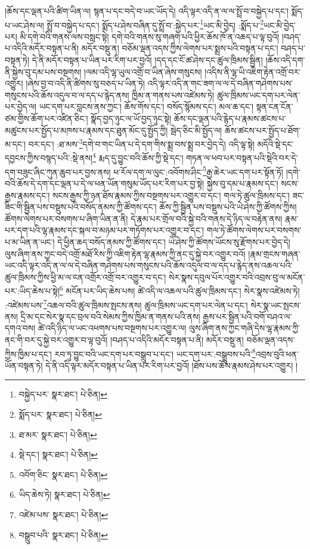 །ཆོས་དང་ལྡན་པའི་ཚིག་ཡིན་ལ། སྙན་པ་དང་བདེ་བ་ཡང་ཡོད་དེ། འདི་ལྟར་འདི་ན་ལ་ལ་སྤྲོ་བ་བསྐྱེད་པ་དང་། སྨོད་པ་ཡང་ཤེས་ལ། སྤྲོ་བ་བསྐྱེད་པ་དང་། སྨོད་པ་ཤེས་བཞིན་དུ་སྤྲོ་བ་:སྐྱེད་པར་\footnote{བསྐྱེད་པར་  སྣར་ཐང་།  པེ་ཅིན། }ཡང་མི་བྱེད། :སྨོད་པ་\footnote{སྨོད་པར་  སྣར་ཐང་།  པེ་ཅིན། }ཡང་མི་བྱེད་པར། མི་དགེ་བའི་གནས་ལས་བསླང་སྟེ། དགེ་བའི་གནས་སུ་གཞག་པའི་ཕྱིར་ཆོས་ཁོ་ན་འཆད་པ་ལྟ་བུའོ། །བཤད་པ་འདིའི་མདོར་བསྟན་པ་ནི། མདོར་བསྡུ་ན། བཅོམ་ལྡན་འདས་ཀྱིས་ལེགས་པར་སྨྲས་པའི་བསྟན་པ་དང་། བཤད་པ་བསྟན་ཏེ། དེ་ནི་མདོར་བསྟན་པ་ཡིན་པར་རིག་པར་བྱའོ། །དད་དང་ངོ་ཚ་ཤེས་དང་ཚུལ་ཁྲིམས་སྦྱིན། །ཆོས་འདི་དག་ནི་སྐྱེས་བུ་དམ་པས་བསྔགས། །ལམ་འདི་ལྷ་ཡུལ་འགྲོ་བ་ཡིན་ཞེས་གསུངས། །འདིས་ནི་ལྷ་ཡི་འཇིག་རྟེན་འགྲོ་བར་འགྱུར། །ཞེས་བྱ་བ་འདི་ནི་ཚིགས་སུ་བཅད་པ་ཡིན་ཏེ། འདི་ལྟར་འདི་ན་གང་ཟག་ལ་ལ་དེ་བཞིན་གཤེགས་པས་གསུངས་པའི་ཆོས་འདུལ་བ་ལ་དད་པ་རྙེད་ནས། ཁྱིམ་ན་གནས་པས་འཛེམས་ཏེ། ཚུལ་ཁྲིམས་ཡང་དག་པར་ལེན་པར་བྱེད་ལ། ཡང་དག་པར་བླངས་ནས་ཀྱང་། ཆོས་གོས་དང་། བསོད་སྙོམས་དང་། མལ་ཆ་དང་། སྟན་ངན་ངོན་ཙམ་གྱིས་ཆོག་པར་འཛིན་ཅིང་། སྣོད་བྱད་ཉུང་ལ་ཡོ་བྱད་ཉུང་སྟེ། ཆོས་དང་ལྡན་པའི་རྙེད་པ་རྣམས་ཚངས་པ་མཚུངས་པར་སྤྱོད་པ་མཁས་པ་རྣམས་དང་ཐུན་མོང་དུ་སྤྱོད་ཀྱི། སྦེད་ཅིང་མི་སྤྱོད་ལ། ཆོས་ཚངས་པར་སྤྱོད་པ་ཐོག་མ་དང་། བར་དང་། :ཐ་མས་\footnote{ཐ་མར་  སྣར་ཐང་།  པེ་ཅིན། }དགེ་བ་གང་ཡིན་པ་དེ་དག་གིས་སྨྲ་བས་སྨྲ་བར་བྱེད་དེ། འདི་ལྟ་སྟེ། མདོའི་སྡེ་དང་དབྱངས་ཀྱིས་བསྙད་པའི་:སྡེ་ནས།\footnote{སྡེ་དང་།  སྣར་ཐང་།  པེ་ཅིན། } རྨད་དུ་བྱུང་བའི་ཆོས་ཀྱི་སྡེ་དང་། གཏན་ལ་ཕབ་པར་བསྟན་པའི་སྡེའི་བར་དེ་དག་བཟུང་ཞིང་ཀུན་ཆུབ་པར་བྱས་ནས། ཕ་རོལ་དག་ལ་ལུང་:འབོགས་ཤིང་\footnote{འབོག་ཅིང་  སྣར་ཐང་།  པེ་ཅིན། }རྒྱ་ཆེར་ཡང་དག་པར་སྟོན་ཏོ། །དགེ་བའི་ཆོས་དེ་དག་དང་ལྡན་པ་དེ་ལ་ཕན་ཡོན་གསུམ་ཡོད་པར་རིག་པར་བྱ་སྟེ། སྐྱེས་བུ་དམ་པ་རྣམས་དང་། སངས་རྒྱས་རྣམས་དང་། སངས་རྒྱས་ཀྱི་ཉན་ཐོས་རྣམས་ཀྱིས་བསྔགས་པར་འགྱུར་བ་དང་། གལ་ཏེ་ཚུལ་ཁྲིམས་དང་། ཟང་ཟིང་གི་སྦྱིན་པས་བསྡུས་པའི་བསོད་ནམས་ཀྱི་ཚོགས་དང་། ཆོས་ཀྱི་སྦྱིན་པས་བསྡུས་པའི་ཡེ་ཤེས་ཀྱི་ཚོགས་ཀྱིས། ཚོགས་ལེགས་པར་བསགས་པ་ཞིག་ཡིན་ན་ནི། དེ་རྣམ་པར་གྲོལ་བའི་སྐྱེ་བའི་གནས་དེ་ཉིད་ལ་བརྟེན་ནས། རྣམ་པར་དག་པའི་ལྷ་རྣམས་དང་སྐལ་བ་མཉམ་པར་གཏོགས་པར་འགྱུར་བ་དང་། གལ་ཏེ་ཚོགས་ལེགས་པར་བསགས་པ་མ་ཡིན་ན་ཡང་། དེ་ཕྱིན་ཆད་བསོད་ནམས་ཀྱི་ཚོགས་དང་། ཡེ་ཤེས་ཀྱི་ཚོགས་ཡོངས་སུ་རྫོགས་པར་བྱེད་དེ། ལུས་ཞིག་ནས་ཀྱང་བདེ་འགྲོ་མཐོ་རིས་ཀྱི་འཇིག་རྟེན་ལྷ་རྣམས་ཀྱི་ནང་དུ་སྐྱེ་བར་འགྱུར་བའོ། །རྣམ་གྲངས་གཞན་ཡང་འདི་ལྟར་འདི་ན་ལ་ལ་དེ་བཞིན་གཤེགས་པས་གསུངས་པའི་ཆོས་འདུལ་བ་ལ་དད་པ་རྙེད་ནས་འཆལ་པའི་ཚུལ་ཁྲིམས་ཀྱིས་ཕྱི་མ་ལ་ངན་འགྲོར་འགྲོ་བར་འགྱུར་བ་དང་། སེར་སྣས་དབུལ་པོར་འགྱུར་བའི་འབྲས་བུ་ལ་མངོན་པར་:ཡིད་ཆེས་པ་སྟེ།\footnote{ཡིད་ཆེས་ཏེ།  སྣར་ཐང་།  པེ་ཅིན། } མངོན་པར་ཡིད་ཆེས་པས། ཚེ་འདི་ལ་འཆལ་པའི་ཚུལ་ཁྲིམས་དང་། སེར་སྣས་འཛེམས་ཏེ། :འཛེམས་པས་\footnote{འཛེམ་པས་  སྣར་ཐང་།  པེ་ཅིན། }འཆལ་བའི་ཚུལ་ཁྲིམས་སྤངས་ནས། ཚུལ་ཁྲིམས་ཡང་དག་པར་ལེན་པ་དང་། སེར་སྣ་ཡང་སྤངས་ནས། དྲི་མ་དང་སེར་སྣ་དང་བྲལ་བའི་སེམས་ཀྱིས་ཁྱིམ་ན་གནས་པའི་ནས། རྒྱས་པར་སྦྱིན་པའི་བགོ་བཤའ་ལ་དགའ་བས། ཚེ་འདི་ཉིད་ལ་ཡང་འཕགས་པས་བསྔགས་པར་འགྱུར་ལ། ལུས་ཞིག་ནས་ཀྱང་གཞི་དེས་ལྷ་རྣམས་ཀྱི་ནང་གི་བར་དུ་སྐྱེ་བར་འགྱུར་བ་ལྟ་བུའོ། །བཤད་པ་འདིའི་མདོར་བསྟན་པ་ནི། མདོར་བསྡུ་ན། བཅོམ་ལྡན་འདས་ཀྱིས་ཁྱིམ་པ་དང་། རབ་ཏུ་བྱུང་བའི་ཡང་དག་པར་བསྒྲུབ་པ་དང་། ཡང་དག་པར་:བསྒྲུབས་པའི་\footnote{བསྒྲུབ་པའི་  སྣར་ཐང་།  པེ་ཅིན། }འབྲས་བུའི་ཕན་ཡོན་བསྟན་ཏེ། དེ་ནི་འདི་ལྟར་མདོར་བསྟན་པ་ཡིན་པར་རིག་པར་བྱའོ། །ཐོས་པས་ཆོས་རྣམས་ཤེས་པར་འགྱུར། །
